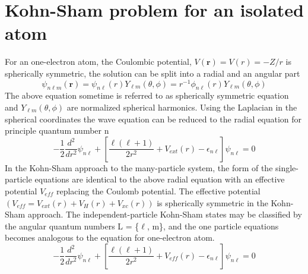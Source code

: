 \section{Kohn-Sham problem for an isolated atom}
For an one-electron atom, the Coulombic potential, $V(\mathbf{r}) = V(r) = -Z/r$ is spherically symmetric, the solution can be split into a radial and an angular part 
\begin{equation}
\label{eq_rad_ang}
\psi_{n\ell m} (\mathbf{r}) = \psi_{n\ell}(r) Y_{\ell m}(\theta,\phi) = r^{-1} \phi_{n\ell}(r) Y_{\ell m} (\theta,\phi)
\end{equation}
The above equation sometime is referred to as spherically symmetric \schrod equation and $Y_{\ell m}(\theta, \phi)$ are normalized spherical harmonics. Using the Laplacian in the spherical coordinates the wave equation can be reduced to the radial equation for principle quantum number n
\begin{equation}
\label{eq_radial}
-\frac{1}{2}\frac{d^2}{dr^2} \psi_{n\ell} + \left [ \frac{\ell(\ell+1)}{2r^2} + V_{ext}(r) - \epsilon_{n\ell} \right ] \psi_{n\ell} = 0
\end{equation}
In the Kohn-Sham approach to the many-particle system, the form of the single-particle equations are identical to the above radial \schrod equation with an effective potential $V_{eff}$ replacing the Coulomb potential. The effective potential $(V_{eff} = V_{ext}(r) + V_{H} (r) + V_{xc} (r))$ is spherically symmetric in the Kohn-Sham approach. The independent-particle Kohn-Sham states may be classified by the angular quantum numbers L = \{$\ell$, m\}, and the one particle equations becomes analogous to the \schrod equation for one-electron atom. 
\begin{equation}
\label{eq_oneparticle}
-\frac{1}{2}\frac{d^2}{dr^2} \psi_{n\ell} + \left [ \frac{\ell(\ell+1)}{2r^2} + V_{eff}(r) - \epsilon_{n\ell} \right ] \psi_{n\ell} = 0
\end{equation}

